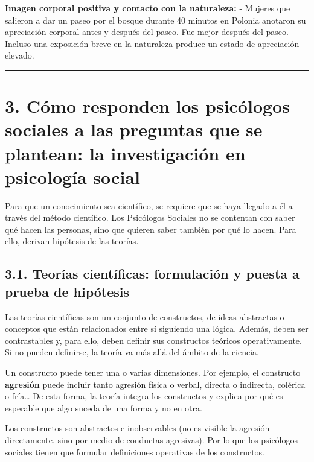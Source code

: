 \documentclass[
]{website}
\begin{document}
\textbf{Imagen corporal positiva y contacto con la naturaleza:}
- Mujeres que salieron a dar un paseo por el bosque durante 40 minutos en Polonia anotaron su apreciación corporal antes y después del paseo. Fue mejor después del paseo.
- Incluso una exposición breve en la naturaleza produce un estado de apreciación elevado.

\begin{center}\rule{0.5\linewidth}{0.5pt}\end{center}

\section*{3. Cómo responden los psicólogos sociales a las preguntas que se plantean: la investigación en psicología social}\label{tema3}

Para que un conocimiento sea científico, se requiere que se haya llegado a él a través del método científico. Los Psicólogos Sociales no se contentan con saber qué hacen las personas, sino que quieren saber también por qué lo hacen. Para ello, derivan hipótesis de las teorías.

\subsection*{3.1. Teorías científicas: formulación y puesta a prueba de hipótesis}\label{subtema3_1}

Las teorías científicas son un conjunto de constructos, de ideas abstractas o conceptos que están relacionados entre sí siguiendo una lógica. Además, deben ser contrastables y, para ello, deben definir sus constructos teóricos operativamente. Si no pueden definirse, la teoría va más allá del ámbito de la ciencia.

Un constructo puede tener una o varias dimensiones. Por ejemplo, el constructo \textbf{agresión} puede incluir tanto agresión física o verbal, directa o indirecta, colérica o fría\ldots{} De esta forma, la teoría integra los constructos y explica por qué es esperable que algo suceda de una forma y no en otra.

Los constructos son abstractos e inobservables (no es visible la agresión directamente, sino por medio de conductas agresivas). Por lo que los psicólogos sociales tienen que formular definiciones operativas de los constructos.
\end{document}
